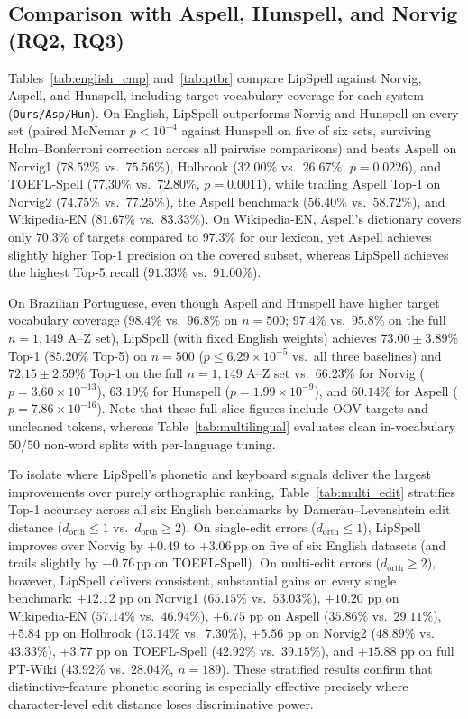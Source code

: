 \documentclass[
  journal=nlp,
  manuscript=research-article,
  year=2026,
]{cup-journal}
\begin{document}
\subsection{Comparison with Aspell, Hunspell, and Norvig (RQ2, RQ3)}
Tables~\ref{tab:english_cmp} and~\ref{tab:ptbr} compare LipSpell against Norvig, Aspell, and Hunspell, including target vocabulary coverage for each system (\texttt{Ours/Asp/Hun}). On English, LipSpell outperforms Norvig and Hunspell on every set (paired McNemar $p < 10^{-4}$ against Hunspell on five of six sets, surviving Holm--Bonferroni correction \parencite{holm1979simple} across all pairwise comparisons) and beats Aspell on Norvig1 ($78.52\%$ vs.\ $75.56\%$), Holbrook ($32.00\%$ vs.\ $26.67\%$, $p=0.0226$), and TOEFL-Spell ($77.30\%$ vs.\ $72.80\%$, $p=0.0011$), while trailing Aspell Top-1 on Norvig2 ($74.75\%$ vs.\ $77.25\%$), the Aspell benchmark ($56.40\%$ vs.\ $58.72\%$), and Wikipedia-EN ($81.67\%$ vs.\ $83.33\%$). On Wikipedia-EN, Aspell's dictionary covers only $70.3\%$ of targets compared to $97.3\%$ for our lexicon, yet Aspell achieves slightly higher Top-1 precision on the covered subset, whereas LipSpell achieves the highest Top-5 recall ($91.33\%$ vs.\ $91.00\%$).

On Brazilian Portuguese, even though Aspell and Hunspell have higher target vocabulary coverage ($98.4\%$ vs.\ $96.8\%$ on $n=500$; $97.4\%$ vs.\ $95.8\%$ on the full $n=1{,}149$ A--Z set), LipSpell (with fixed English weights) achieves $73.00\pm3.89\%$ Top-1 ($85.20\%$ Top-5) on $n=500$ ($p \le 6.29\times 10^{-5}$ vs.\ all three baselines) and $72.15\pm2.59\%$ Top-1 on the full $n=1{,}149$ A--Z set vs.\ $66.23\%$ for Norvig ($p=3.60\times 10^{-13}$), $63.19\%$ for Hunspell ($p=1.99\times 10^{-9}$), and $60.14\%$ for Aspell ($p=7.86\times 10^{-16}$). Note that these full-slice figures include OOV targets and uncleaned tokens, whereas Table~\ref{tab:multilingual} evaluates clean in-vocabulary $50/50$ non-word splits with per-language tuning.

To isolate where LipSpell's phonetic and keyboard signals deliver the largest improvements over purely orthographic ranking, Table~\ref{tab:multi_edit} stratifies Top-1 accuracy across all six English benchmarks by Damerau--Levenshtein edit distance ($d_{\text{orth}} \le 1$ vs.\ $d_{\text{orth}} \ge 2$). On single-edit errors ($d_{\text{orth}} \le 1$), LipSpell improves over Norvig by $+0.49$ to $+3.06$\,pp on five of six English datasets (and trails slightly by $-0.76$\,pp on TOEFL-Spell). On multi-edit errors ($d_{\text{orth}} \ge 2$), however, LipSpell delivers consistent, substantial gains on every single benchmark: $+12.12$ pp on Norvig1 ($65.15\%$ vs.\ $53.03\%$), $+10.20$ pp on Wikipedia-EN ($57.14\%$ vs.\ $46.94\%$), $+6.75$ pp on Aspell ($35.86\%$ vs.\ $29.11\%$), $+5.84$ pp on Holbrook ($13.14\%$ vs.\ $7.30\%$), $+5.56$ pp on Norvig2 ($48.89\%$ vs.\ $43.33\%$), $+3.77$ pp on TOEFL-Spell ($42.92\%$ vs.\ $39.15\%$), and $+15.88$ pp on full PT-Wiki ($43.92\%$ vs.\ $28.04\%$, $n=189$). These stratified results confirm that distinctive-feature phonetic scoring is especially effective precisely where character-level edit distance loses discriminative power.
\end{document}
